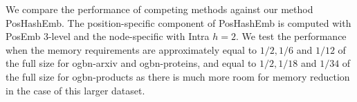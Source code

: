 \documentclass[conference]{IEEEtran}
\begin{document}
We compare the performance of competing methods against our method PosHashEmb. The position-specific component of PosHashEmb is computed with PosEmb $3$-level and the node-specific with Intra $h=2$.
We test the performance when the memory requirements are approximately equal to $1/2, 1/6$ and $1/12$ of the full size for ogbn-arxiv and ogbn-proteins, and equal to $1/2, 1/18$ and $1/34$ of the full size for ogbn-products as there is much more room for memory reduction in the case of this larger dataset.  
\end{document}
